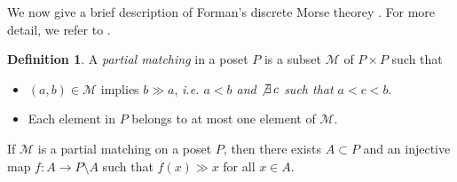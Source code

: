 \documentclass{amsart}
\theoremstyle{definition}
\newtheorem{definition}[theorem]{Definition}
\theoremstyle{remark}
\numberwithin{equation}{section}
\newcommand{\M}{\mathcal{M}}
\newcommand{\vr}[2]{\mathcal{VR}(#1;#2)}
\def\Z{{\mathbb{Z}}}
\newcommand{\raju}[1]{\textcolor{darkviolet!65!black}{#1}}
\begin{document}
	
	
	
	


We now give a brief description of Forman's discrete Morse theorey \cite{Forman1998}. For more detail, we refer to \cite{Kozlovbook}. 
\begin{definition}\cite[Definition 11.1]{Kozlovbook}
	A {\it partial matching} in a poset $P$ is a subset $\M$ of $P \times P$ such that
	\begin{itemize}
		\item $(a,b) \in \M$ implies $b \gg a$, {\it i.e. $a<b$ and $\not\exists \,c$ such that $a<c<b$}.
		\item Each element  in $P$ belongs to at most one element of $\M$.
	\end{itemize}
\end{definition}
If $\M$ is a  partial matching on a poset $P$,
then there exists  $A \subset P$ and an injective map $f: A
\rightarrow P\setminus A$ such that $f(x)\gg x$ for all $x \in A$. 
\end{document}

